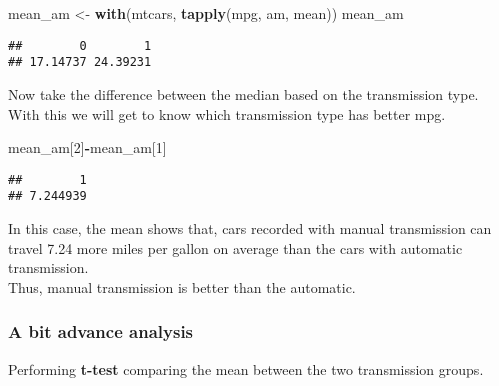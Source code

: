 \documentclass[
]{article}
\newenvironment{Shaded}{\begin{snugshade}}{\end{snugshade}}
\newcommand{\AttributeTok}[1]{\textcolor[rgb]{0.13,0.29,0.53}{#1}}
\newcommand{\ConstantTok}[1]{\textcolor[rgb]{0.56,0.35,0.01}{#1}}
\newcommand{\DecValTok}[1]{\textcolor[rgb]{0.00,0.00,0.81}{#1}}
\newcommand{\FunctionTok}[1]{\textcolor[rgb]{0.13,0.29,0.53}{\textbf{#1}}}
\newcommand{\NormalTok}[1]{#1}
\newcommand{\OtherTok}[1]{\textcolor[rgb]{0.56,0.35,0.01}{#1}}
\newcommand{\SpecialCharTok}[1]{\textcolor[rgb]{0.81,0.36,0.00}{\textbf{#1}}}
\newcommand{\StringTok}[1]{\textcolor[rgb]{0.31,0.60,0.02}{#1}}
\begin{document}
\begin{Shaded}
\begin{Highlighting}[]
\NormalTok{mean\_am }\OtherTok{\textless{}{-}} \FunctionTok{with}\NormalTok{(mtcars,}
               \FunctionTok{tapply}\NormalTok{(mpg, am, mean))}
\NormalTok{mean\_am }
\end{Highlighting}
\end{Shaded}

\begin{verbatim}
##        0        1 
## 17.14737 24.39231
\end{verbatim}

Now take the difference between the median based on the transmission
type. With this we will get to know which transmission type has better
mpg.

\begin{Shaded}
\begin{Highlighting}[]
\NormalTok{mean\_am[}\DecValTok{2}\NormalTok{]}\SpecialCharTok{{-}}\NormalTok{mean\_am[}\DecValTok{1}\NormalTok{]}
\end{Highlighting}
\end{Shaded}

\begin{verbatim}
##        1 
## 7.244939
\end{verbatim}

In this case, the mean shows that, cars recorded with manual
transmission can travel 7.24 more miles per gallon on average than the
cars with automatic transmission.\\
Thus, manual transmission is better than the automatic.

\hypertarget{a-bit-advance-analysis}{%
\subsubsection{A bit advance analysis}\label{a-bit-advance-analysis}}

Performing \textbf{t-test} comparing the mean between the two
transmission groups.

\begin{Shaded}
\end{Shaded}
\end{document}
